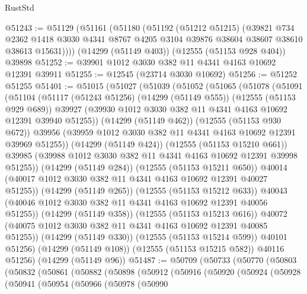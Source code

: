 \begin{lexlean}{RustStd}
\begin{coremodule}
@51243 := @51129
    (@51161
      (@51180
        (@51192
          (@51212 @51215)
          (@39821
            @734
            @2362
            @1418
            @3030
            @4341
            @8767
            @4205
            @3104
            @39876
            @38604
            @38607
            @38610
            @38613
            @15631))))
    (@14299 (@51149 @403))
    (@12555 (@51153 @928 @404))
    @39898
@51252 := @39901 @1012 @3030 @382 @11 @4341 @4163 @10692 @12391 @39911
@51255 := @12545 (@23714 @3030 @10692)
@51256 := @51252 @51255
@51401 := @51015
    (@51027
      (@51039
        (@51052
          (@51065
            (@51078
              (@51091
                (@51104
                  (@51117
                    (@51243 @51256)
                    (@14299 (@51149 @555))
                    (@12555 (@51153 @929 @689))
                    @39927
                    (@39930 @1012 @3030 @382 @11 @4341 @4163 @10692 @12391 @39940 @51255))
                  (@14299 (@51149 @462))
                  (@12555 (@51153 @930 @672))
                  @39956
                  (@39959 @1012 @3030 @382 @11 @4341 @4163 @10692 @12391 @39969 @51255))
                (@14299 (@51149 @424))
                (@12555 (@51153 @15210 @661))
                @39985
                (@39988 @1012 @3030 @382 @11 @4341 @4163 @10692 @12391 @39998 @51255))
              (@14299 (@51149 @284))
              (@12555 (@51153 @15211 @650))
              @40014
              (@40017 @1012 @3030 @382 @11 @4341 @4163 @10692 @12391 @40027 @51255))
            (@14299 (@51149 @265))
            (@12555 (@51153 @15212 @633))
            @40043
            (@40046 @1012 @3030 @382 @11 @4341 @4163 @10692 @12391 @40056 @51255))
          (@14299 (@51149 @358))
          (@12555 (@51153 @15213 @616))
          @40072
          (@40075 @1012 @3030 @382 @11 @4341 @4163 @10692 @12391 @40085 @51255))
        (@14299 (@51149 @330))
        (@12555 (@51153 @15214 @599))
        @40101
        @51256)
      (@14299 (@51149 @108))
      (@12555 (@51153 @15215 @582))
      @40116
      @51256)
    (@14299 (@51149 @96))
@51487 := @50709
    (@50733
      (@50770
        (@50803
          (@50832
            (@50861
              (@50882
                (@50898
                  (@50912
                    (@50916
                      (@50920
                        (@50924
                          (@50928
                            (@50941
                              (@50954
                                (@50966
                                  (@50978
                                    (@50990

\end{coremodule}
\end{lexlean}
